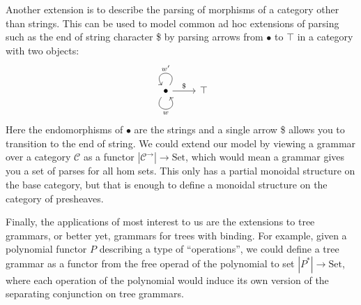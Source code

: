 \documentclass[12pt]{article}
\newcommand{\Set}{\textrm{Set}}
\begin{document}
Another extension is to describe the parsing of morphisms of a
category other than strings. This can be used to model common ad hoc
extensions of parsing such as the end of string character \$ by
parsing arrows from $\bullet$ to $\top$ in a category with two
objects:
\[%
\begin{tikzcd}
\bullet \arrow[r, "\$"] \arrow["w"', loop, distance=2em, in=305, out=235] \arrow["w'"', loop, distance=2em, in=125, out=55] & \top
\end{tikzcd}\]
Here the endomorphisms of $\bullet$ are the strings and a single arrow
\$ allows you to transition to the end of string.  We could extend our
model by viewing a grammar over a category $\mathcal C$ as a functor
$|\mathcal C^\to| \to \Set$, which would mean a grammar gives you a
set of parses for all hom sets. This only has a partial monoidal
structure on the base category, but that is enough to define a
monoidal structure on the category of presheaves.

Finally, the applications of most interest to us are the extensions to
tree grammars, or better yet, grammars for trees with binding. For
example, given a polynomial functor $P$ describing a type of
``operations'', we could define a tree grammar as a functor from the
free operad of the polynomial to set $|P^*| \to \Set$, where each
operation of the polynomial would induce its own version of the
separating conjunction on tree grammars.
\end{document}
